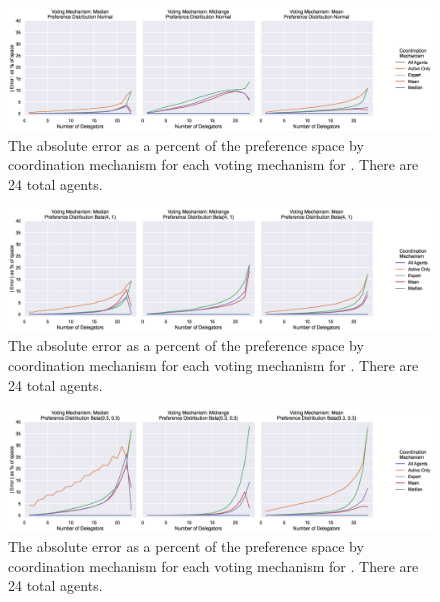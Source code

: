 \begin{landscape}
    \begin{figure}[p]
        \centering
        \includegraphics[scale=0.55]
        {content/chapter2/figures/distributions/Normal_error_as_percent_of_space_abs_mean}
        \caption{
            The absolute error as a percent of the preference space by coordination
            mechanism for each voting mechanism for \gaussiandist.
            There are 24 total agents.
        }
        \label{fig:normal-error-as-percent-of-space-abs-mean}
    \end{figure}
\end{landscape}

\begin{landscape}
    \begin{figure}[p]
        \centering
        \includegraphics[scale=0.55]
        {content/chapter2/figures/distributions/Beta(4,_1)_error_as_percent_of_space_abs_mean}
        \caption{
            The absolute error as a percent of the preference space by coordination
            mechanism for each voting mechanism for .
            There are 24 total agents.
        }
        \label{fig:beta-4-1-error-as-percent-of-space-abs-mean}
    \end{figure}
\end{landscape}

\begin{landscape}
    \begin{figure}[p]
        \centering
        \includegraphics[scale=0.55]
        {content/chapter2/figures/distributions/Beta(0.3,_0.3)_error_as_percent_of_space_abs_mean}
        \caption{
            The absolute error as a percent of the preference space by coordination
            mechanism for each voting mechanism for .
            There are 24 total agents.
        }
        \label{fig:beta-.3-.3-error-as-percent-of-space-abs-mean}
    \end{figure}
\end{landscape}